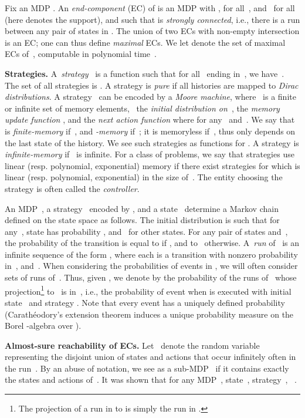 \documentclass{llncs}
\begin{document}
Fix an MDP .
An \emph{end-component} (EC) of  is
an MDP  with ,  for all~,
and~ for all~
(here  denotes the support),  and such that  is \textit{strongly connected}, i.e., there is a run between any pair of states in .
The union of two ECs with non-empty intersection is
an EC; one can thus define \emph{maximal} ECs.
We let  denote the set of maximal ECs of~, computable in
polynomial time~\cite{DeAlfaro-phd97}.

\smallskip\noindent\textbf{Strategies.} A~\emph{strategy}~ is a function  such that
for all~ ending in~, we have~. The set of all strategies is . A strategy is \textit{pure} if all histories are mapped to \textit{Dirac distributions}. A strategy~ can be encoded by a 
\emph{Moore machine},  
where~ is a finite or infinite set of memory elements,~ the \emph{initial
distribution on~}, 
 the \emph{memory update
function} , 
and  the \emph{next action
function} where  for any~ and~.
We say that~ is \emph{finite-memory} if~, and \emph{-memory} if~;
it is memoryless if~, thus only depends on the last state of the history. 
We see such strategies as functions  for . 
A strategy is \emph{infinite-memory} if~ is infinite.
For a class of problems, we say that strategies use linear (resp. polynomial, exponential) memory 
if there exist strategies for which  is linear (resp. polynomial, exponential) in the size of~. The entity choosing the strategy is often called the \textit{controller}.

An MDP~, a strategy~ encoded by , and a state~ determine a
Markov chain  defined on the state space  as follows.
The initial distribution is such that for any~,
state  has probability , and~ for other states. For any pair of states
 and~, the probability of the transition  is
equal to 
if , and to~ otherwise.
A~\emph{run} of~ is an infinite sequence of the form
, where each
 is a transition with nonzero probability
in~, and~. 
When considering the probabilities of events in , we
will often consider sets of runs of~. Thus, given , we denote by  the probability of the runs 
of~ whose projection\footnote{The projection of a run
 in  to  is simply the run  in .} to~ is in~, i.e., the probability of event  when  is executed with initial state~ and strategy . Note that every event has a uniquely defined probability \cite{vardi_FOCS85} (Carath\'eodory's extension theorem induces a unique probability measure on the Borel -algebra over ).


\smallskip\noindent\textbf{Almost-sure reachability of ECs.} Let~ denote the random variable representing the disjoint union of states and actions that occur
infinitely often in the run~. By an abuse of notation,
we see  as a sub-MDP~ if it contains
exactly the states and actions of~. 
It was shown that for any MDP~, state~, strategy~,
~\cite{DeAlfaro-phd97}.
\end{document}
